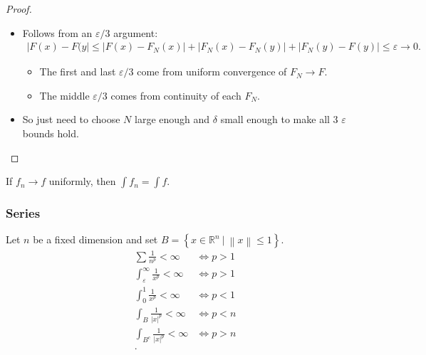 \begin{proof}

\envlist

\begin{itemize}
\item
  Follows from an \(\varepsilon/3\) argument:
  \begin{align*}  
  {\left\lvert {F(x) - F(y} \right\rvert} \leq 
  {\left\lvert {F(x) - F_N(x)} \right\rvert} + {\left\lvert {F_N(x) - F_N(y)} \right\rvert} + {\left\lvert {F_N(y) - F(y)} \right\rvert} 
  \leq {\varepsilon}\to 0
  .\end{align*}

  \begin{itemize}
  \tightlist
  \item
    The first and last \({\varepsilon}/3\) come from uniform convergence
    of \(F_N\to F\).
  \item
    The middle \({\varepsilon}/3\) comes from continuity of each
    \(F_N\).
  \end{itemize}
\item
  So just need to choose \(N\) large enough and \(\delta\) small enough
  to make all 3 \(\varepsilon\) bounds hold.
\end{itemize}

\end{proof}

\begin{proposition}

If \(f_n \to f\) uniformly, then \(\int f_n = \int f\).

\end{proposition}

\hypertarget{series}{%
\subsubsection{Series}\label{series}}

\begin{proposition}[p-tests]

Let \(n\) be a fixed dimension and set
\(B = \left\{{x\in {\mathbb{R}}^n {~\mathrel{\Big|}~}{\left\lVert {x} \right\rVert} \leq 1}\right\}\).
\begin{align*}
\sum \frac 1 {n^p} < \infty &\iff p>1 \\
\int_\varepsilon^\infty \frac 1 {x^p} < \infty 
&\iff p>1 \\
\int_0^1 \frac 1 {x^p} < \infty 
&\iff p<1 \\
\int_B \frac{1}{{\left\lvert {x} \right\rvert}^p} < \infty &\iff p < n \\
\int_{B^c} \frac{1}{{\left\lvert {x} \right\rvert}^p} < \infty &\iff p > n \\
.\end{align*}

\end{proposition}

